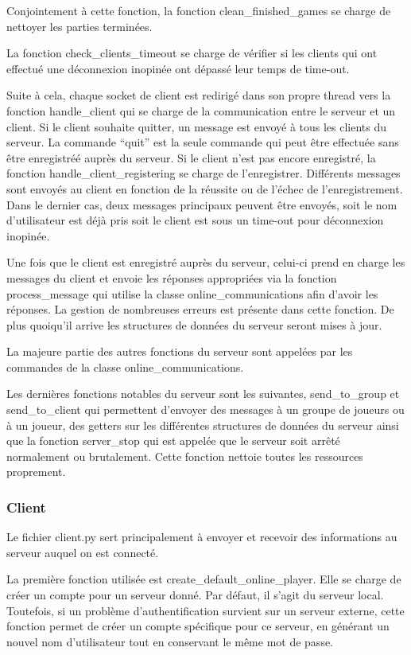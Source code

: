 \documentclass[11pt]{article}
\begin{document}
Conjointement à cette fonction, la fonction clean\_finished\_games se charge de nettoyer les parties terminées.


La fonction check\_clients\_timeout se charge de vérifier si les clients qui ont effectué une déconnexion inopinée ont dépassé leur temps de time-out.

Suite à cela, chaque socket de client est redirigé dans son propre thread vers la fonction handle\_client qui se charge de la communication entre le serveur et un client.
Si le client souhaite quitter, un message est envoyé à tous les clients du serveur.
La commande “quit” est la seule commande qui peut être effectuée sans être enregistréé auprès du serveur. 
Si le client n’est pas encore enregistré, la fonction handle\_client\_registering se charge de l’enregistrer. 
Différents messages sont envoyés au client en fonction de la réussite ou de l’échec de l’enregistrement.
Dans le dernier cas, deux messages principaux peuvent être envoyés, soit le nom d’utilisateur est déjà pris soit le client est sous un time-out pour déconnexion inopinée.

Une fois que le client est enregistré auprès du serveur, celui-ci prend en charge les messages du client et envoie les réponses appropriées via la fonction process\_message qui utilise la classe online\_communications afin d’avoir les réponses. 
La gestion de nombreuses erreurs est présente dans cette fonction. De plus quoiqu’il arrive les structures de données du serveur seront mises à jour.

La majeure partie des autres fonctions du serveur sont appelées par les commandes de la classe online\_communications.

Les dernières fonctions notables du serveur sont les suivantes, send\_to\_group et send\_to\_client qui permettent d’envoyer des messages à un groupe de joueurs ou à un joueur, 
des getters sur les différentes structures de données du serveur ainsi que la fonction server\_stop qui est appelée que le serveur soit arrêté normalement ou brutalement.
 Cette fonction nettoie toutes les ressources proprement.


\subsubsection{Client}
Le fichier client.py sert principalement à envoyer et recevoir des informations au serveur auquel on est connecté.



La première fonction utilisée est create\_default\_online\_player. Elle se charge de créer un compte pour un serveur donné. Par défaut, il s’agit du serveur local. 
Toutefois, si un problème d’authentification survient sur un serveur externe, cette fonction permet de créer un compte spécifique pour ce serveur, en générant un nouvel nom d’utilisateur tout en conservant le même mot de passe.
\end{document}
